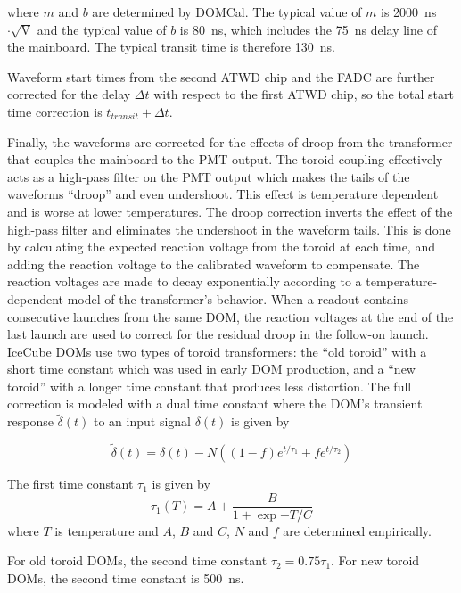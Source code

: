 where $m$ and $b$ are determined by DOMCal. The typical value of $m$
is 2000~ns$\cdot \sqrt{\mathrm{V}}$ and the typical value of $b$ is
80~ns, which includes the 75~ns delay line of the mainboard. The
typical transit time is therefore 130~ns. 

Waveform start times from the second ATWD chip and the FADC are further
corrected for the delay $\Delta t$ with respect to the first ATWD
chip, so the total start time correction is $t_{transit} + \Delta t$.

Finally, the waveforms are corrected for the effects of droop from the
transformer that couples the mainboard to the PMT output. The toroid
coupling effectively acts as a high-pass filter on the PMT output
which makes the tails of the waveforms ``droop'' and even
undershoot. This effect is temperature dependent and is worse at lower
temperatures. The droop correction inverts the effect of the high-pass
filter and eliminates the undershoot in the waveform tails. This is
done by calculating the expected reaction voltage from the toroid at
each time, and adding the reaction voltage to the calibrated waveform
to compensate. The reaction voltages are made to decay exponentially
according to a temperature-dependent model of the transformer’s
behavior. When a readout contains consecutive launches from the same
DOM, the reaction voltages at the end of the last launch are used to
correct for the residual droop in the follow-on launch. IceCube DOMs
use two types of toroid transformers: the ``old toroid'' with a short
time constant which was used in early DOM production, and a ``new
toroid'' with a longer time constant that produces less
distortion. The  full correction is modeled with a dual time constant
where the DOM's transient response $\tilde{\delta}(t)$ to an input
signal $\delta(t)$ is given by

\begin{equation}
\tilde{\delta}(t) = \delta (t) - N((1 - f) e^{t/\tau_1} +f
e^{t/\tau_2})
\end{equation}

The first time constant $\tau_1$ is given by 
\begin{equation}
\tau_1(T) = A + \frac{B}{1 + \exp{-T/C}}
\end{equation}
where $T$ is temperature and $A$, $B$ and $C$, $N$ and $f$ are determined empirically.

For old toroid DOMs, the second time constant $\tau_2 =
0.75\tau_1$. For new toroid DOMs, the second time constant is 500~ns. 

